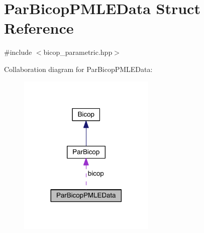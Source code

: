 \hypertarget{struct_par_bicop_p_m_l_e_data}{}\section{Par\+Bicop\+P\+M\+L\+E\+Data Struct Reference}
\label{struct_par_bicop_p_m_l_e_data}


{\ttfamily \#include $<$bicop\+\_\+parametric.\+hpp$>$}



Collaboration diagram for Par\+Bicop\+P\+M\+L\+E\+Data\+:
\nopagebreak
\begin{figure}[H]
\begin{center}
\leavevmode
\includegraphics[width=185pt]{struct_par_bicop_p_m_l_e_data__coll__graph}
\end{center}
\end{figure}

